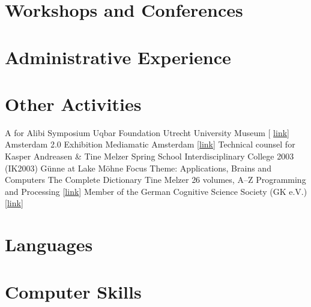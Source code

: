 \documentclass[10pt,a4paper,sans]{moderncv}
\begin{document}
\section{Workshops and Conferences}


\section{Administrative Experience}


\section{Other Activities}
        {A for Alibi Symposium}
        {}
        {Uqbar Foundation}
        {Utrecht University Museum [%
        \href{http://www.sternbergpress.com/?pageId=1204}{link}]}
        {}	
        {Amsterdam 2.0 Exhibition}
        {}
        {Mediamatic}
        {Amsterdam [\href{http://www.mediamatic.net/artefact-9850-en.html}%
        {link}]}
        {Technical counsel for Kasper Andreasen \& Tine Melzer}
        {Spring School}
        {}
        {Interdisciplinary College 2003 (IK2003)}
        {G\"{u}nne at Lake M\"{o}hne}
        {Focus Theme: Applications, Brains and Computers}
        {The Complete Dictionary}
        {}
        {Tine Melzer}
        {26 volumes, A--Z}
        {Programming and Processing
        [\href{http://www.tinemelzer.eu/works/the-complete-dictionary/}
        {link}]}
        {Member of the German Cognitive Science Society (GK e.V.)}
        {}
        {}
        {[\href{http://www.gk-ev.de}{link}]}
        {}


\section{Languages}


\section{Computer Skills}


\clearpage
\end{document}
